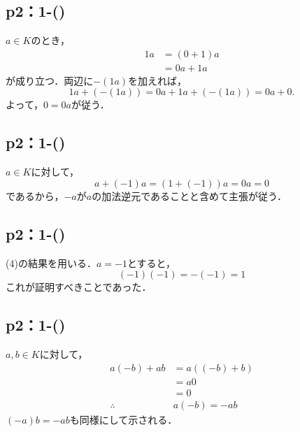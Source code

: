 \subsection*{p2：1-()}
\begin{tproof}
    $a \in K$のとき，
    \begin{align*}
        1a & = (0 + 1)a \\
           & = 0a + 1a
    \end{align*}
    が成り立つ．両辺に$-(1a)$を加えれば，
    \[
        1a + (-(1a)) = 0a + 1a + (-(1a)) = 0a + 0.
    \]
    よって，$0 = 0a$が従う．
\end{tproof}

\subsection*{p2：1-()}
\begin{tproof}
    $a \in K$に対して，
    \[
        a+(-1)a=(1+(-1))a =0a =0
    \]
    であるから，$-a$が$a$の加法逆元であることと含めて主張が従う．
\end{tproof}



\subsection*{p2：1-()}
\begin{tproof}
    (4)の結果を用いる．$a=-1$とすると，
    \[
        (-1)(-1)=-(-1)=1
    \]
    これが証明すべきことであった．
\end{tproof}
\subsection*{p2：1-()}
\begin{tproof}
    $a,b \in K$に対して，
    \begin{align*}
        a(-b)+ab         & = a((-b)+b) \\
                         & = a0        \\
                         & =0          \\
        \therefore \quad & a(-b)=-ab
    \end{align*}
    $(-a)b = -ab$も同様にして示される．
\end{tproof}

